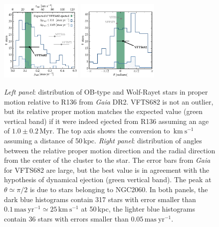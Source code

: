 \documentclass[a4paper,fleqn,usenatbib]{mnras}
\newcommand{\kms}{{\,\mathrm{km\ s^{-1}}}}
\begin{document}

\vspace*{10pt}%
\begin{figure}[tbp]
  \centering
  \includegraphics[width=0.35\textwidth]{figures/dist_mu_region.pdf}
  \includegraphics[width=0.35\textwidth]{figures/angle}
  \caption{\emph{Left panel}: distribution of OB-type and Wolf-Rayet stars in proper
    motion relative to R136 from \emph{Gaia} DR2. VFTS682 is not an outlier, but
    its relative proper motion matches the expected value (green
    vertical band) if it were indeed
    ejected from R136 assuming an age of $1.0\pm0.2$\,Myr. The top axis shows the conversion to $\kms$
    assuming a distance of 50\,kpc. \emph{Right panel}:  distribution of
    angles between the relative proper motion direction and the radial
    direction from the center of the cluster to the star. The error bars from \emph{Gaia} for VFTS682 are large, but
    the best value is in agreement with the hypothesis of dynamical
    ejection (green vertical band). The peak at $\theta\simeq\pi/2$ is due to stars
    belonging to NGC2060. In both
    panels, the dark blue histograms contain 317 
    stars with error smaller than $0.1\,\mathrm{mas \
      yr^{-1}}\simeq25\,\mathrm{km\ s^{-1}}$ at 50\,kpc, the
    lighter blue histograms contain 36 stars with errors smaller than $0.05\,\mathrm{mas \
      yr^{-1}}$. }
  \label{fig:dist}
\end{figure}
\end{document}
